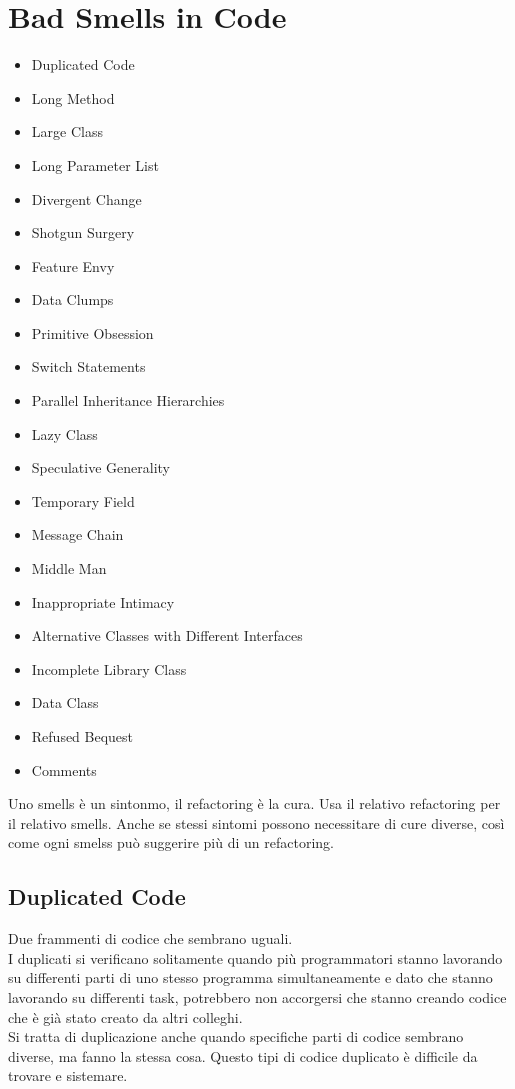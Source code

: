 \section{Bad Smells in Code}
\begin{itemize}
    \item Duplicated Code
    \item Long Method
    \item Large Class
    \item Long Parameter List
    \item Divergent Change
    \item Shotgun Surgery
    \item Feature Envy
    \item Data Clumps
    \item Primitive Obsession
    \item Switch Statements
    \item Parallel Inheritance Hierarchies
    \item Lazy Class
    \item Speculative Generality
    \item Temporary Field
    \item Message Chain
    \item Middle Man
    \item Inappropriate Intimacy
    \item Alternative Classes with Different Interfaces
    \item Incomplete Library Class
    \item Data Class
    \item Refused Bequest
    \item Comments
\end{itemize}
Uno smells è un sintonmo, il refactoring è la cura. Usa il relativo refactoring per
il relativo smells. Anche se stessi sintomi possono necessitare di cure diverse, così come
ogni smelss può suggerire più di un refactoring.
\subsection{Duplicated Code}
Due frammenti di codice che sembrano uguali.\\
I duplicati si verificano solitamente quando più programmatori stanno lavorando
su differenti parti di uno stesso programma simultaneamente e dato che stanno 
lavorando su differenti task, potrebbero non accorgersi che stanno creando codice che
è già stato creato da altri colleghi.\\
Si tratta di duplicazione anche quando specifiche parti di codice sembrano diverse,
ma fanno la stessa cosa. Questo tipi di codice duplicato è difficile da trovare e sistemare.\\
